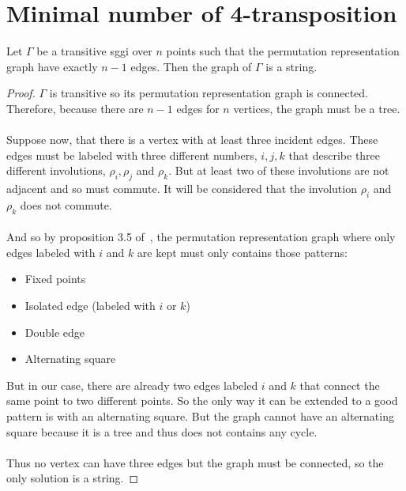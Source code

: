 \section{Minimal number of 4-transposition}

\begin{lemma}\label{graphIsString}
  Let $\Gamma$ be a transitive sggi over $n$ points such that the permutation representation graph have exactly $n-1$ edges. Then the graph of $\Gamma$ is a string.
\end{lemma}

\begin{proof}
  $\Gamma$ is transitive so its permutation representation graph is connected. Therefore, because there are $n-1$ edges for $n$ vertices, the graph must be a tree.

  \paragraph{}
  Suppose now, that there is a vertex with at least three incident edges. These edges must be labeled with three different numbers, $i, j, k$ that describe three different involutions, $\rho_i, \rho_j$ and $\rho_k$. But at least two of these involutions are not adjacent and so must commute. It will be considered that the involution $\rho_i$ and $\rho_k$ does not commute.

  \paragraph{}
  And so by proposition 3.5 of~\cite{cprGraph}, the permutation representation graph where only edges labeled with $i$ and $k$ are kept must only contains those patterns:
  \begin{itemize}
    \item Fixed points
    \item Isolated edge (labeled with $i$ or $k$)
    \item Double edge
    \item Alternating square
  \end{itemize}
  But in our case, there are already two edges labeled $i$ and $k$ that connect the same point to two different points. So the only way it can be extended to a good pattern is with an alternating square. But the graph cannot have an alternating square because it is a tree and thus does not contains any cycle.

  \paragraph{}
  Thus no vertex can have three edges but the graph must be connected, so the only solution is a string.
\end{proof}

